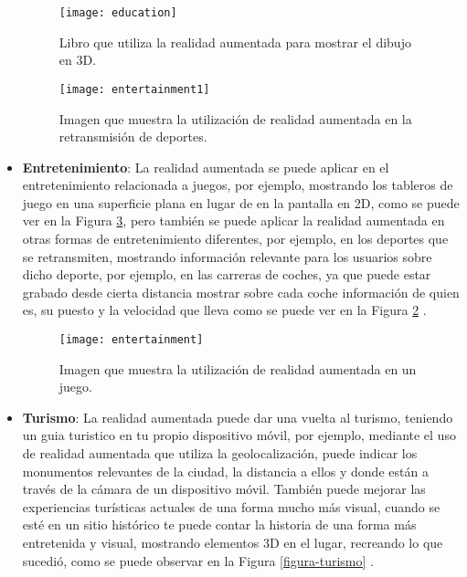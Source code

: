 \begin{itemize}
  \begin{figure}[h]
    \centering
    \texttt{[image: education]}
    \caption{Libro que utiliza la realidad aumentada para mostrar el dibujo en 3D.\protect\footnotemark}
    \label{figura-educacion}
  \end{figure}


  \begin{figure}[h]
    \centering
    \texttt{[image: entertainment1]}
    \caption{Imagen que muestra la utilización de realidad aumentada en la retransmisión de deportes. \cite{van-krevelen}}
    \label{figura-entretenimiento1}
  \end{figure}

  \item \textbf{Entretenimiento}: La realidad aumentada se puede aplicar en el entretenimiento relacionada a juegos, por ejemplo, mostrando los tableros de juego en una superficie plana en lugar de en la pantalla en 2D, como se puede ver en la Figura \ref{figura-entretenimiento}, pero también se puede aplicar la realidad aumentada en otras formas de entretenimiento diferentes, por ejemplo, en los deportes que se retransmiten, mostrando información relevante para los usuarios sobre dicho deporte, por ejemplo, en las carreras de coches, ya que puede estar grabado desde cierta distancia mostrar sobre cada coche información de quien es, su puesto y la velocidad que lleva como se puede ver en la Figura \ref{figura-entretenimiento1} \cite{van-krevelen}.

  \begin{figure}[h]
    \centering
    \texttt{[image: entertainment]}
    \caption{Imagen que muestra la utilización de realidad aumentada en un juego.\protect\footnotemark}
    \label{figura-entretenimiento}
  \end{figure}


  \item \textbf{Turismo}: La realidad aumentada puede dar una vuelta al turismo, teniendo un guia turistico en tu propio dispositivo móvil, por ejemplo, mediante el uso de realidad aumentada que utiliza la geolocalización, puede indicar los monumentos relevantes de la ciudad, la distancia a ellos y donde están a través de la cámara de un dispositivo móvil. También puede mejorar las experiencias turísticas actuales de una forma mucho más visual, cuando se esté en un sitio histórico te puede contar la historia de una forma más entretenida y visual, mostrando elementos 3D en el lugar, recreando lo que sucedió, como se puede observar en la Figura \ref{figura-turismo} \cite{reinoso}.


\end{itemize}
